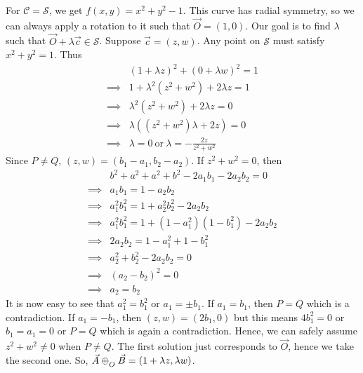 For $\mathcal{C}=\mathcal{S}$, we get $f(x,y) = x^2 + y^2 - 1$. This curve has
radial symmetry, so we can always apply a rotation to it such that
$\vec{O}=(1,0)$. Our goal is to find $\lambda$ such that
$\vec{O}+\lambda\vec{c}\in\mathcal{S}$. Suppose $\vec{c}=(z,w)$. Any point on
$\mathcal{S}$ must satisfy $x^2+y^2=1$. Thus
\begin{align*}
    &(1 + \lambda z)^2 + (0 + \lambda w)^2 = 1 \\
    \implies& 1 + \lambda^2 (z^2 + w^2) + 2 \lambda z = 1 \\
    \implies& \lambda^2 (z^2 + w^2) + 2 \lambda z = 0 \\
    \implies& \lambda((z^2 + w^2)\lambda + 2 z) = 0 \\
    \implies& \lambda = 0\ \mathrm{or}\ \lambda = -\frac{2 z}{z^2 + w^2}
\end{align*}
Since $P \neq Q$, $(z,w)=(b_1-a_1,b_2-a_2)$. If $z^2+w^2=0$, then
\begin{align*}
    & b^2+a^2+a^2+b^2-2 a_1 b_1-2 a_2 b_2 = 0 \\
    \implies& a_1 b_1 = 1 - a_2 b_2 \\
    \implies& a_1^2 b_1^2 = 1 + a_2^2 b_2^2 - 2 a_2 b_2 \\
    \implies& a_1^2 b_1^2 = 1 + (1-a_1^2)(1-b_1^2) - 2 a_2 b_2 \\
    \implies& 2 a_2 b_2 = 1 - a_1^2 + 1 - b_1^2 \\
    \implies& a_2^2 + b_2^2 - 2 a_2 b_2 = 0 \\
    \implies& (a_2 - b_2)^2 = 0 \\
    \implies& a_2 = b_2
\end{align*}
It is now easy to see that $a_1^2=b_1^2$ or $a_1=\pm b_1$. If $a_1=b_1$, then
$P=Q$ which is a contradiction. If $a_1=-b_1$, then $(z,w)=(2b_1,0)$ but this
means $4b_1^2=0$ or $b_1=a_1=0$ or $P=Q$ which is again a contradiction. Hence,
we can safely assume $z^2+w^2 \neq 0$ when $P \neq Q$. The first solution just
corresponds to $\vec{O}$, hence we take the second one. So,
$\vec{A}\conop\vec{B}=(1+\lambda z,\lambda w)$.

